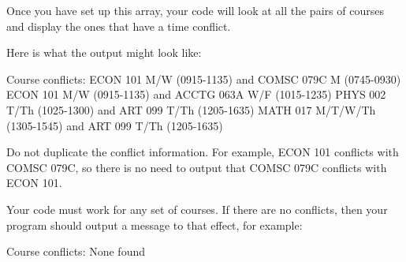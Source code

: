 \begin{exercise}
Once you have set up this array, your code will look at all the pairs of courses and display the ones that have a time conflict.

Here is what the output might look like:

\begin{stdout}
Course conflicts:
ECON 101 M/W (0915-1135) and COMSC 079C M (0745-0930)
ECON 101 M/W (0915-1135) and ACCTG 063A W/F (1015-1235)
PHYS 002 T/Th (1025-1300) and ART 099 T/Th (1205-1635)
MATH 017 M/T/W/Th (1305-1545) and ART 099 T/Th (1205-1635)
\end{stdout}

Do not duplicate the conflict information. For example, ECON 101 conflicts with COMSC 079C, so there is no need to output that COMSC 079C conflicts with ECON 101.

Your code must work for any set of courses. If there are no conflicts, then your program should output a message to that effect, for example:

\begin{stdout}
Course conflicts:
None found
\end{stdout}

\end{exercise}

